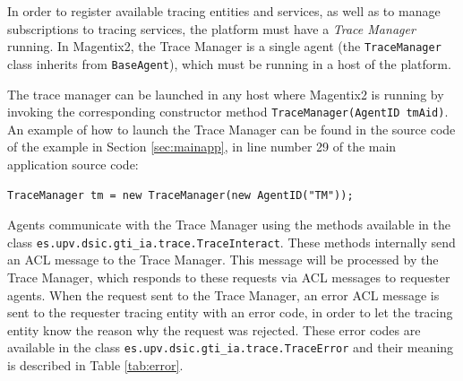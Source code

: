 	In order to register available tracing entities and services, as well as to manage subscriptions to
	tracing services, the platform must have a \textit{Trace Manager} running. In Magentix2, the Trace
	Manager is a single agent (the \texttt{TraceManager} class inherits from \texttt{BaseAgent}), which
	must be running in a host of the platform. %

	The trace manager can be launched in any host where Magentix2 is running by invoking the
	corresponding constructor method \lstinline{TraceManager(AgentID tmAid)}. An example of how to
	launch the Trace Manager can be found in the source code of the example in
	Section \ref{sec:mainapp}, in line number 29 of the main application source code:

	\begin{lstlisting}
TraceManager tm = new TraceManager(new AgentID("TM"));
	\end{lstlisting}

	Agents communicate with the Trace Manager using the methods available in the class
	\lstinline{es.upv.dsic.gti_ia.trace.TraceInteract}. These methods internally send an ACL message to
	the Trace Manager. This message will be processed by the Trace Manager, which responds to these
	requests via ACL messages to requester agents. When the request sent to the Trace Manager, an
	error ACL message is sent to the requester tracing entity with an error code, in order to let the tracing
	entity know the reason why the request was rejected. These error codes are available in the class
	\lstinline{es.upv.dsic.gti_ia.trace.TraceError} and their meaning is described in Table \ref{tab:error}.

